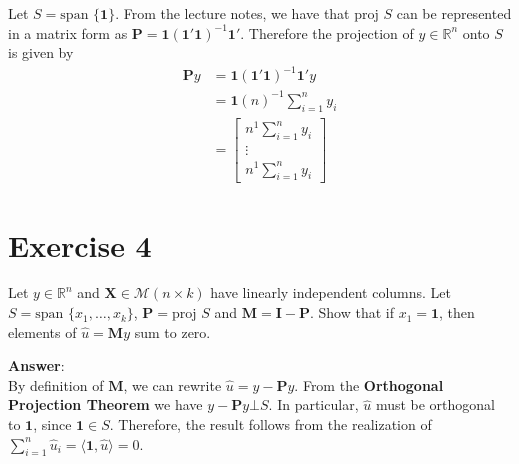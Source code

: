 \documentclass[11pt,twoside,fleqn,reqno,a4paper]{amsart}
\numberwithin{equation}{section}
\newcommand{\matr}[1]{\mathbf{#1}} %
\begin{document}
Let $S= \text{span } \{ \mathbf{1} \}$. From the lecture notes, we have that $ \text{proj } S$ can be represented
in a matrix form as $\matr{P} = \mathbf{1} (\mathbf{1}'\mathbf{1})^{-1} \mathbf{1}' $. Therefore the projection 
of $y \in \mathbb{R}^n$ onto $S$ is given by
\begin{align*}
\matr{P} y  & = \mathbf{1} (\mathbf{1}'\mathbf{1})^{-1} \mathbf{1}'y \\
            & = \mathbf{1} (n)^{-1} \sum_{i=1}^n y_i \\
            & = \begin{bmatrix}
                n^{1} \sum_{i=1}^n y_i \\ \vdots \\ n^{1} \sum_{i=1}^n y_i
                \end{bmatrix}  
\end{align*}

\section*{Exercise 4}
\setcounter{section}{3}
\begin{em}
Let $ y\in \mathbb{R}^n $ and $ \matr{X} \in \mathcal{M}(n\times k) $ have linearly independent columns. Let
$S = \text{span } \{x_1, \ldots, x_k\}$, $ \matr{P} = \text{proj } S$ and $ \matr{M} = \matr{I} - \matr{P} $. 
Show that if $ x_1 = \mathbf{1} $, then elements of $\hat{u} = \matr{M}y$ sum to zero.
\end{em} 

\textbf{Answer}: \\
By definition of $ \matr{M} $, we can rewrite $ \hat{u} = y - \matr{P}y$. From the \textbf{Orthogonal Projection
Theorem} we have $ y - \matr{P}y \bot S$. In particular, $\hat{u}$ must be orthogonal to $ \mathbf{1}$, since $\mathbf{1}\in S$. 
Therefore, the result follows from the realization of $\sum_{i=1}^n \hat{u}_i = \langle \mathbf{1}, \hat{u} \rangle = 0$.


\end{document}
